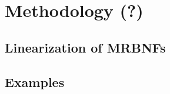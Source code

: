 
\chapter{Methodology (?)}\label{chapter:introduction}

  \section{Linearization of MRBNFs}

    
  \section{Examples}
